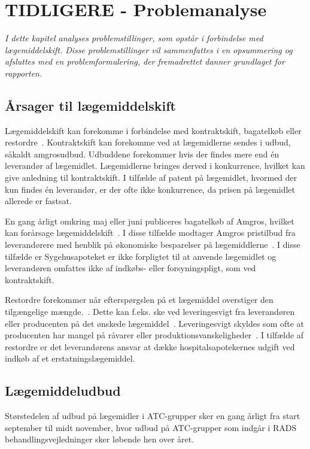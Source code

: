 \chapter{TIDLIGERE - Problemanalyse}
\textit{I dette kapitel analyses problemstillinger, som opstår i forbindelse med lægemiddelskift. Disse problemstillinger vil sammenfattes i en opsummering og afsluttes med en problemformulering, der fremadrettet danner  grundlaget for rapporten.}

\section{Årsager til lægemiddelskift}
Lægemiddelskift kan forekomme i forbindelse med kontraktskift, bagatelkøb eller restordre~\citep{Amgros2015}. Kontraktskift kan forekomme ved at lægemidlerne sendes i udbud, såkaldt amgrosudbud. Udbuddene forekommer hvis der findes mere end én leverandør af lægemidlet. Lægemidlerne bringes derved i konkurrence, hvilket kan give anledning til kontraktskift. I tilfælde af patent på lægemidlet, hvormed der kun findes én leverandør, er der ofte ikke konkurrence, da prisen på lægemidlet allerede er fastsat.~\citep{Amgros2015} 

En gang årligt omkring maj eller juni publiceres bagatelkøb af Amgros, hvilket kan forårsage lægemiddelskift~\citep{Amgros2018}. I disse tilfælde modtager Amgros pristilbud fra leverandørere med henblik på økonomiske besparelser på lægemiddlerne~\citep{Amgros2012}. I disse tilfælde er Sygehusapoteket er ikke forpligtet til at anvende lægemidlet og leverandøren omfattes ikke af indkøbs- eller forsyningspligt, som ved kontraktskift.~\citep{Amgros2018}

Restordre forekommer når efterspørgslen på et lægemiddel overstiger den tilgængelige mængde.~\citep{Amgros2015}. Dette kan f.eks. ske ved leveringesvigt fra leverandøren eller producenten på det ønskede lægemiddel~\citep{Amgros2017, Laegemiddelinformaion2017}. Leveringesvigt skyldes som ofte at producenten har mangel på råvarer eller produktionsvanskeligheder~\citep{Amgros2017, Laegemiddelinformaion2017}. I tilfælde  af restordre er det leverandørens ansvar at dække hospitalsapotekernes udgift ved indkøb af et erstatningslægemiddel.

\section{Lægemiddeludbud}
Størstedelen af udbud på lægemidler i ATC-grupper sker en gang årligt fra start september til midt november, hvor udbud på ATC-grupper som indgår i RADS behandlingsvejledninger  sker løbende hen over året.~\citep{Sygehusapoteket2017}

